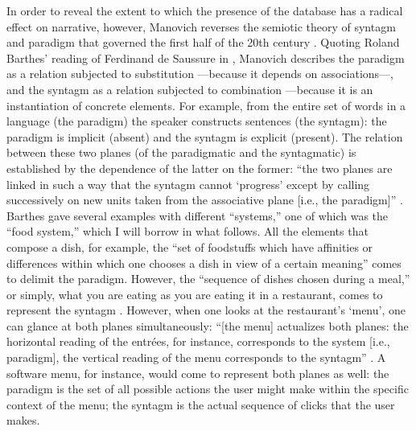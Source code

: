
In order to reveal the extent to which the presence of the database has a radical effect on narrative, however, Manovich reverses the semiotic theory of syntagm and paradigm that governed the first half of the 20th century \parencite[231]{Man01:The}. Quoting Roland Barthes' reading of Ferdinand de Saussure in , Manovich describes the paradigm as a relation subjected to substitution ---because it depends on associations---, and the syntagm as a relation subjected to combination ---because it is an instantiation of concrete elements. For example, from the entire set of words in a language (the paradigm) the speaker constructs sentences (the syntagm): the paradigm is implicit (absent) and the syntagm is explicit (present). The relation between these two planes (of the paradigmatic and the syntagmatic) is established by the dependence of the latter on the former: ``the two planes are linked in such a way that the syntagm cannot `progress' except by calling successively on new units taken from the associative plane [i.e., the paradigm]'' \parencite[59]{Bar68:Ele}. Barthes gave several examples with different ``systems,'' one of which was the ``food system,'' which I will borrow in what follows. All the elements that compose a dish, for example, the ``set of foodstuffs which have affinities or differences within which one chooses a dish in view of a certain meaning'' comes to delimit the paradigm. However, the ``sequence of dishes chosen during a meal,'' or simply, what you are eating as you are eating it in a restaurant, comes to represent the syntagm \parencite[63]{Bar68:Ele}. However, when one looks at the restaurant's `menu', one can glance at both planes simultaneously: ``[the menu] actualizes both planes: the horizontal reading of the entrées, for instance, corresponds to the system [i.e., paradigm], the vertical reading of the menu corresponds to the syntagm'' \parencite[63]{Bar68:Ele}. A software menu, for instance, would come to represent both planes as well: the paradigm is the set of all possible actions the user might make within the specific context of the menu; the syntagm is the actual sequence of clicks that the user makes. 

